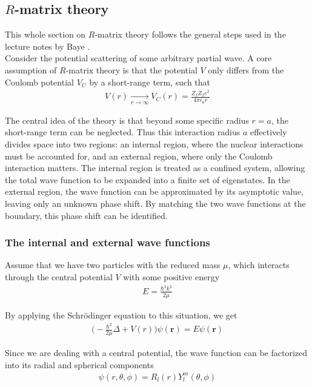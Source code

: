 \subsection{$R$-matrix theory}
This whole section on $R$-matrix theory follows the general steps used in the lecture notes by Baye \cite{Baye lecture notes}. \\ 

Consider the potential scattering of some arbitrary partial wave. A core assumption of $R$-matrix theory is that the potential $V$ only differs from the Coulomb potential $V_C$ by a short-range term, such that
\begin{align*}
	V(r) \xrightarrow[r \rightarrow \infty]{} V_C(r) = \frac{Z_1 Z_2 e^2}{4\pi\epsilon_0 r}
\end{align*}

The central idea of the theory is that beyond some specific radius $r = a$, the short-range term can be neglected. Thus this interaction radius $a$ effectively divides space into two regions: an internal region, where the nuclear interactions must be accounted for, and an external region, where only the Coulomb interaction matters. The internal region is treated as a confined system, allowing the total wave function to be expanded into a finite set of eigenstates. In the external region, the wave function can be approximated by its asymptotic value, leaving only an unknown phase shift. By matching the two wave functions at the boundary, this phase shift can be identified. 

\subsubsection{The internal and external wave functions}
Assume that we have two particles with the reduced mass $\mu$, which interacts through the central potential $V$ with some positive energy 
\begin{align*}
	E = \frac{\hbar^2 k^2}{2\mu}
\end{align*}

By applying the Schrödinger equation to this situation, we get
\begin{align*}
	\bigg(-\frac{\hbar^2}{2\mu} \Delta + V(r)\bigg)\psi(\bm{r}) = E\psi(\bm{r})
\end{align*}

Since we are dealing with a central potential, the wave function can be factorized into its radial and spherical components
\begin{align} \label{theory: r-matrix: factorization}
	\psi(r, \theta, \phi) = R_l(r) Y^m_l(\theta, \phi)
\end{align}

